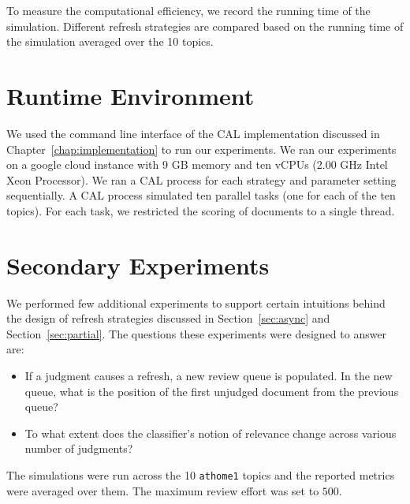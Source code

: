 To measure the computational efficiency, we record the running time of the
simulation. Different refresh strategies are compared based on the running time
of the simulation averaged over the 10 topics.


\section{Runtime Environment}

We used the command line interface of the CAL implementation discussed in
Chapter~\ref{chap:implementation} to run our experiments. We ran our experiments
on a google cloud instance with 9 GB memory and ten vCPUs (2.00 GHz Intel Xeon
Processor). We ran a CAL process for each strategy and parameter setting
sequentially. A CAL process simulated ten parallel tasks (one for each of the
ten topics). For each task, we restricted the scoring of documents to a single
thread.

\section{Secondary Experiments}
\label{sec:secondary}

We performed few additional experiments to support certain intuitions behind the
design of refresh strategies discussed in Section~\ref{sec:async} and
Section~\ref{sec:partial}. The questions these experiments were designed to
answer are:
\begin{itemize}
    \item If a judgment causes a refresh, a new review queue is populated.
        In the new queue, what is the position of the first unjudged document
        from the previous queue?
    \item To what extent does the classifier's notion of relevance change across
        various number of judgments?
\end{itemize}

The simulations were run across the 10
\texttt{athome1} topics and the reported metrics were averaged over them. The
maximum review effort was set to $500$.



